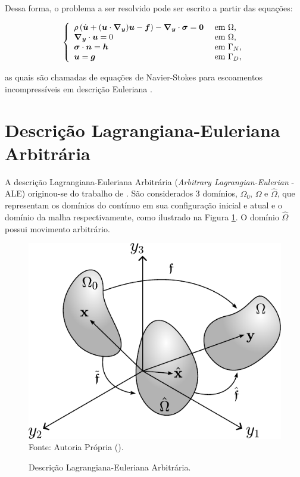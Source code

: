 Dessa forma, o problema a ser resolvido pode ser escrito a partir das equações:

\begin{equation}
    \left\{
    \begin{array}{ll}
        \rho\left({\dot{\boldsymbol{u}}+(\boldsymbol{u}\cdot\boldsymbol{\nabla_y})\boldsymbol{u}-\boldsymbol{f}}\right)-\boldsymbol{\nabla_y}\cdot\boldsymbol{\sigma}=\boldsymbol{0} & \text{ em }\Omega\text{,}   \\
        \boldsymbol{\nabla_y}\cdot\boldsymbol{u}=0                                                             & \text{ em }\Omega\text{,}   \\
        \boldsymbol{\sigma}\cdot\boldsymbol{n}=\boldsymbol{h}                                                      & \text{ em }\Gamma_N\text{,} \\
        \boldsymbol{u}=\boldsymbol{g}                                                                & \text{ em }\Gamma_D\text{,}
    \end{array}
    \right.
    \label{eq:NS-Euler}
\end{equation}

\noindent as quais são chamadas de equações de Navier-Stokes para escoamentos incompressíveis em descrição Euleriana \cite{bazilevs2013computational,bazilevs2010large,bazilevs2007variational,hughes2002variational,hughes2000large}.

\section{Descrição Lagrangiana-Euleriana Arbitrária} \label{CFD-ALE}

A descrição Lagrangiana-Euleriana Arbitrária (\textit{Arbitrary Lagrangian-Eulerian} - ALE) originou-se do trabalho de . São considerados 3 domínios, $\Omega_0$, $\Omega$ e $\hat{\Omega}$, que representam os domínios do contínuo em sua configuração inicial e atual e o domínio da malha respectivamente, como ilustrado na Figura \ref{Fig:ALE}. O domínio $\hat{\Omega}$ possui movimento arbitrário.

\begin{figure}[h!]
    \centering
    \caption{Descrição Lagrangiana-Euleriana Arbitrária.}
    \includegraphics[width=.45\linewidth]{Figuras/ALE.pdf}
    \label{Fig:ALE}
    \\Fonte: Autoria Própria (\the\year).
\end{figure}

